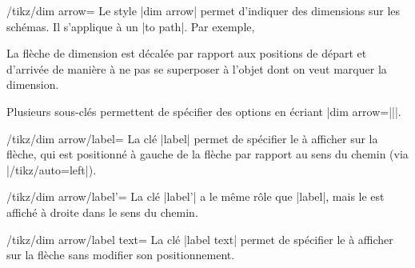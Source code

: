 \documentclass[a4paper]{ltxdoc}
\begin{document}
\begin{stylekey}{/tikz/dim arrow=}
  Le style |dim arrow| permet d'indiquer des dimensions sur les schémas. Il s'applique à un |to path|. Par exemple,

  \begin{codeexample}[width=4cm]
  \end{codeexample}

  La flèche de dimension est décalée par rapport aux positions de départ et d'arrivée de manière à ne pas se superposer
  à l'objet dont on veut marquer la dimension.

  Plusieurs sous-clés permettent de spécifier des options en écriant |dim arrow={||}|.

  \begin{key}{/tikz/dim arrow/label=}
  La clé |label| permet de spécifier le  à afficher sur la flèche, qui est positionné à gauche de la flèche par rapport au sens du chemin (via |/tikz/auto=left|).
  \end{key}

  \begin{key}{/tikz/dim arrow/label'=}
  La clé |label'| a le même rôle que |label|, mais le  est affiché à droite dans le sens du chemin.
  \end{key}


\begin{codeexample}[]
\end{codeexample}

  \begin{key}{/tikz/dim arrow/label text=}
  La clé |label text| permet de spécifier le  à afficher sur la flèche sans modifier son positionnement.
  \end{key}


\end{stylekey}
\end{document}

